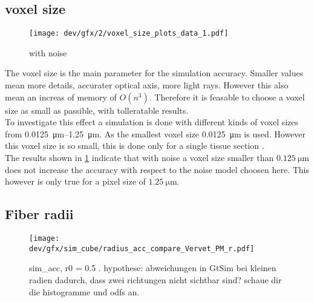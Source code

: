 \subsection{voxel size \texorpdfstring{\voxels{}}{}}
% 
% 
% 
\begin{figure}[!tp]%
\centering
\texttt{[image: dev/gfx/2/voxel\_size\_plots\_data\_1.pdf]}
\caption[voxel size model with noise]{with noise \dummy{}}
\label{fig:voxelsizeNoise}
\end{figure}
% 
The voxel size \voxelsize{} is the main parameter for the simulation accuracy.
Smaller values mean more details, accurater optical axis, more light rays.
However this also mean an increas of memory of $O(n^3)$.
Therefore it is feasable to choose a voxel size as small as passible, with tolleratable results.
\\
% 
To investigate this effect a simulation is done with different kinds of voxel sizes from \SIrange{0.0125}{1.25}{\micro\meter}.
As  the smallest voxel size \SI{0.0125}{\micro\meter} is used. 
However this voxel size is so small, this is done only for a single tissue section .
\\
%
The results shown in \cref{fig:voxelsizeNoise} indicate that with noise a voxel size smaller than $\SI{0.125}{\micro\meter}$ does not increase the accuracy with respect to the noise model choosen here.
This however is only true for a pixel size of $\SI{1.25}{\micro\meter}$.
% 
% 
% 
\subsection{Fiber radii}
% 
\begin{figure}[!t]
\centering
\texttt{[image: dev/gfx/sim\_cube/radius\_acc\_compare\_Vervet\_PM\_r.pdf]}
\caption[sim acc]{sim\_acc, r0 = 0.5 \dummy{}. hypothese: abweichungen in GtSim bei kleinen radien dadurch, dass zwei richtungen nicht sichtbar sind? schaue dir die histogramme und odfs an.}
\label{fig:parameterModelSimGain}
\end{figure}
% 
% 
